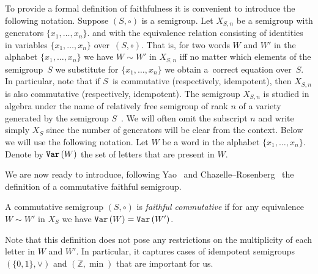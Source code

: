 \documentclass{toc}
\begin{document}
To provide a formal definition of faithfulness it is convenient to introduce the
following notation. Suppose $(S, \circ)$ is a
semigroup. Let $X_{S,n}$ be a semigroup with generators $\{x_1,\ldots, x_n\}$.
and with the equivalence relation  %
consisting of identities in variables $\{x_1,\ldots, x_n\}$ over~$(S,\circ)$.
That is, for two words $W$ and $W'$ in
the alphabet $\{x_1,\ldots,x_n\}$ we have $W\sim W'$ in $X_{S,n}$ iff no matter
which elements of the semigroup~$S$ we substitute for $\{x_1,\ldots, x_n\}$ we
obtain a~correct equation over~$S$. In particular, note that if $S$~is
commutative (respectively, idempotent), then $X_{S,n}$ is also commutative
(respectively, idempotent).
The semigroup $X_{S,n}$ is studied in algebra under the name of relatively free
semigroup of rank $n$ of a variety generated by
the   %
semigroup
$S$~\cite{neumann2012varieties}. %
We will often omit the subscript $n$ and write
simply $X_S$ since the number of generators will be clear from the context.
Below we will use the following notation. Let $W$ be a word in the alphabet
$\{x_1,\ldots, x_n\}$. Denote by $\texttt{Var}\,(W)$ the set of letters that are present
in $W$.

We are now ready to introduce,
following Yao~\cite{DBLP:conf/stoc/Yao82} and
Chazelle--Rosenberg~\cite{DBLP:journals/ijcga/ChazelleR91}  %
the definition of a commutative faithful semigroup.

\begin{definition}[Yao, Chazelle--Rosenberg]  %
\label{def:faithfulcommutative}
A commutative semigroup $(S, \circ)$ is \emph{faithful commutative} if for any
equivalence $W\sim W'$ in $X_S$ we have $\texttt{Var}\,(W)=\texttt{Var}\,(W')$.
\end{definition}


Note that this definition does not pose any restrictions on the
multiplicity
of
each letter %
in $W$ and $W'$. In particular, it captures cases of idempotent semigroups
$(\{0,1\}, \vee)$ and $(\mathbb{Z},\min)$ that are important for us.
\end{document}
